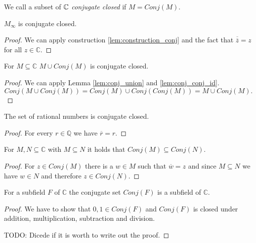 \begin{definition}
    \label{def:conj_closed}
    \leanok
    We call a subset of $\mathbb{C}$ \emph{conjugate closed} if $M= Conj(M)$.
\end{definition}


\begin{lemma}
    \label{lem:conj_MField}
    \leanok
    $M_{\infty}$ is conjugate closed.
\end{lemma}
\begin{proof}
    We can apply construction \ref{lem:construction_conj} and the fact that $\overline{\overline z} = z$ for all $z \in\mathbb{C}$.
\end{proof}

\begin{lemma}
    \label{lem:M_con_M}
    \leanok
    For $M\subseteq \mathbb{C}$ $M\cup Conj(M)$ is conjugate closed.
\end{lemma}
\begin{proof}
    We can apply Lemma \ref{lem:conj_union} and \ref{lem:conj_conj_id}.
    $$Conj(M\cup Conj(M)) = Conj(M) \cup Conj(Conj(M)) = M \cup Conj(M).$$
\end{proof}

\begin{lemma}
    \label{lem:ConjClosed.Rat_ConjClosed}
    \leanok
    The set of rational numbers is conjugate closed.
\end{lemma}

\begin{proof}
    For every $r \in \mathbb{Q}$ we have $\overline{r} = r$.
\end{proof}

\begin{lemma}
    \label{lem:ConjClosed.conj_inclusion}
    \leanok
    For $M,N \subseteq \mathbb{C}$ with $M \subseteq N$ it holds that $Conj(M) \subseteq Conj(N)$.
\end{lemma}
\begin{proof}
    For $z \in Conj(M)$ there is a $w \in M$ such that $\overline{w} = z$ and since $M \subseteq N$ we have $w \in N$ and therefore $z \in Conj(N)$.
\end{proof}

\begin{lemma}
    \label{lem:ConjClosed.conj_field}
    \leanok
    For a subfield $F$  of $\mathbb{C}$ the conjugate set $Conj(F)$ is a subfield of $\mathbb{C}$.
\end{lemma}
\begin{proof}
    We have to show that $0,1 \in Conj(F)$ and $Conj(F)$ is closed under addition, multiplication, subtraction and division.

    TODO: Dicede if it is worth to write out the proof.
\end{proof}

